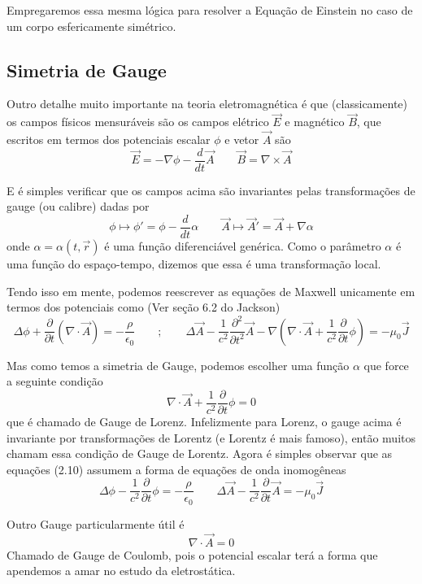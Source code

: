 \documentclass[11pt]{article}
\begin{document}
Empregaremos essa mesma lógica para resolver a Equação de Einstein no
caso de um corpo esfericamente simétrico.

    \hypertarget{simetria-de-gauge}{%
\subsection{Simetria de Gauge}\label{simetria-de-gauge}}

    Outro detalhe muito importante na teoria eletromagnética é que
(classicamente) os campos físicos mensuráveis são os campos elétrico
\(\vec{E}\) e magnético \(\vec{B}\), que escritos em termos dos
potenciais escalar \(\phi\) e vetor \(\vec{A}\) são
\[\tag{2.8} \vec{E} = - \nabla \phi - \frac{d}{dt}\vec{A} \qquad \vec{B} = \nabla \times \vec{A}  \]

E é simples verificar que os campos acima são invariantes pelas
transformações de gauge (ou calibre) dadas por
\[\tag{2.9} \phi \mapsto \phi' = \phi - \frac{d}{dt}\alpha \qquad \vec{A} \mapsto \vec{A}' = \vec{A} + \nabla \alpha \]
onde \(\alpha = \alpha(t, \vec{r})\) é uma função diferenciável
genérica. Como o parâmetro \(\alpha\) é uma função do espaço-tempo,
dizemos que essa é uma transformação local.

Tendo isso em mente, podemos reescrever as equações de Maxwell
unicamente em termos dos potenciais como (Ver seção 6.2 do Jackson)
\[\tag{2.10} \Delta \phi + \frac{\partial}{\partial t} (\nabla\cdot \vec{A}) = - \frac{\rho}{\epsilon_0} 
\qquad ; \qquad \Delta \vec{A} - \frac{1}{c^2} \frac{\partial^2 }{\partial t^2} \vec{A} - \nabla \left( \nabla \cdot \vec{A} + 
\frac{1}{c^2} \frac{\partial}{\partial t}\phi \right) = - \mu_0 \vec{J} \]

Mas como temos a simetria de Gauge, podemos escolher uma função
\(\alpha\) que force a seguinte condição
\[ \nabla \cdot \vec{A} + \frac{1}{c^2} \frac{\partial}{\partial t}\phi = 0 \]
que é chamado de Gauge de Lorenz. Infelizmente para Lorenz, o gauge
acima é invariante por transformações de Lorentz (e Lorentz é mais
famoso), então muitos chamam essa condição de Gauge de Lorentz. Agora é
simples observar que as equações (2.10) assumem a forma de equações de
onda inomogêneas
\[ \tag{2.11} \Delta \phi - \frac{1}{c^2} \frac{\partial}{\partial t} \phi = - \frac{\rho}{\epsilon_0}
\qquad \Delta \vec{A} - \frac{1}{c^2} \frac{\partial}{\partial t}  \vec{A} = - \mu_0 \vec{J}
\]

Outro Gauge particularmente útil é
\[ \tag{2.12} \nabla\cdot \vec{A} = 0 \] Chamado de Gauge de Coulomb,
pois o potencial escalar terá a forma que apendemos a amar no estudo da
eletrostática.
\end{document}
